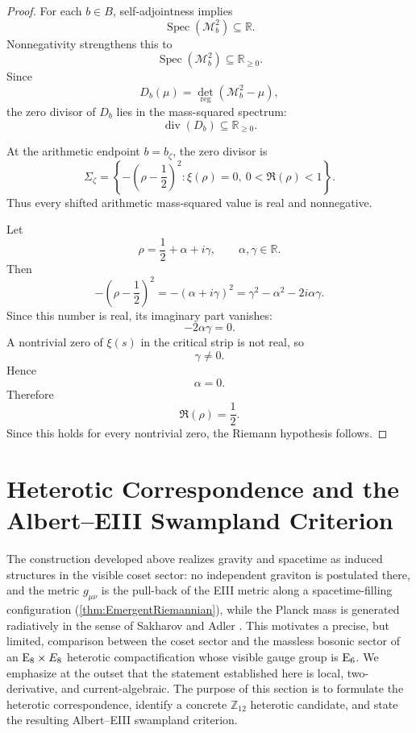 \documentclass[pdflatex,sn-mathphys-num]{sn-jnl}
\theoremstyle{thmstyleone}
\theoremstyle{thmstylethree}%
\theoremstyle{thmstyletwo}%
\begin{document}
\begin{proof}
For each \(b\in B\), self-adjointness implies
\[
\operatorname{Spec}(\mathcal M_b^2)\subseteq\mathbb R.
\]
Nonnegativity strengthens this to
\[
\operatorname{Spec}(\mathcal M_b^2)\subseteq\mathbb R_{\ge0}.
\]
Since
\[
D_b(\mu)=\det_{\mathrm{reg}}(\mathcal M_b^2-\mu),
\]
the zero divisor of \(D_b\) lies in the mass-squared spectrum:
\[
\operatorname{div}(D_b)\subseteq\mathbb R_{\ge0}.
\]

At the arithmetic endpoint \(b=b_{\zeta}\), the zero divisor is
\[
\Sigma_{\zeta}
=
\left\{
-\left(\rho-\frac12\right)^2:
\xi(\rho)=0,\ 0<\Re(\rho)<1
\right\}.
\]
Thus every shifted arithmetic mass-squared value is real and nonnegative.

Let
\[
\rho=\frac12+\alpha+i\gamma,
\qquad
\alpha,\gamma\in\mathbb R.
\]
Then
\[
-\left(\rho-\frac12\right)^2
=
-(\alpha+i\gamma)^2
=
\gamma^2-\alpha^2-2i\alpha\gamma.
\]
Since this number is real, its imaginary part vanishes:
\[
-2\alpha\gamma=0.
\]
A nontrivial zero of \(\xi(s)\) in the critical strip is not real, so
\[
\gamma\neq0.
\]
Hence
\[
\alpha=0.
\]
Therefore
\[
\Re(\rho)=\frac12.
\]
Since this holds for every nontrivial zero, the Riemann hypothesis follows.
\end{proof}

\section{Heterotic Correspondence and the Albert--EIII Swampland Criterion}
\label{sec:StringTheory}

The construction developed above realizes gravity and spacetime as
induced structures in the visible coset sector: no independent graviton is
postulated there, and the metric
$g_{\mu\nu}$ is the pull-back of the EIII metric along a spacetime-filling
configuration (\autoref{thm:EmergentRiemannian}), while the Planck mass is
generated radiatively in the sense of Sakharov and Adler
\cite{SakharovInducedGravity,AdlerInducedGravity}. This motivates a precise,
but limited, comparison between the coset sector and the massless bosonic
sector of an $\mathrm{E}_{8}\times E_{8}$ heterotic compactification \cite{GHMR:1985}
whose visible gauge group is $\mathrm{E}_{6}$. We emphasize at the outset that the
statement established here is local, two-derivative, and current-algebraic. The
purpose of this section is to formulate the heterotic correspondence, identify a
concrete $\mathbb Z_{12}$ heterotic candidate, and state the resulting
Albert--EIII swampland criterion.
\end{document}
